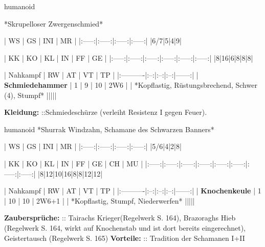 \label{duglim}
 {{humanoid
 		
 *Skrupelloser Zwergenschmied*


 |  WS  |  GS  |  INI  |  MR | 
 |:-----:|:-----:|:-----:|:-----:|
 |6/7|5|4|9|


 |  KK  |  KO  |  KL  |  IN  |  FF  |  GE  |
 |:-----:|:-----:|:-----:|:-----:|:-----:|:-----:|
 |8|16|6|8|8|8|


 | Nahkampf  | RW | AT | VT | TP    |
 |:----------|:--:|:--:|:--:|------:|
 | \textbf{Schmiedehammer} | 1  | 9 | 10 | 2W6 |
 | *Kopflastig, Rüstungsbrechend, Schwer (4), Stumpf* |||||


 \textbf{Kleidung:} ::Schmiedeschürze (verleiht Resistenz I gegen Feuer).


 }}


 {{humanoid
 *Shurrak Windzahn, Schamane des Schwarzen Banners*


 |  WS  |  GS  |  INI  |  MR | 
 |:-----:|:-----:|:-----:|:-----:|
 |5/6|4|2|8|


 |  KK  |  KO  |  KL  |  IN  |  FF  |  GE  |  CH  |  MU  |
 |:-----:|:-----:|:-----:|:-----:|:-----:|:-----:|:-----:|:-----:|
 |8|12|10|16|8|8|12|12|


 | Nahkampf  | RW | AT | VT | TP    |
 |:----------|:--:|:--:|:--:|------:|
 | \textbf{Knochenkeule} | 1  | 10 | 10 | 2W6+1 |
 | *Kopflastig, Stumpf, Niederwerfen* |||||


 \textbf{Zaubersprüche:} :: Tairachs Krieger(Regelwerk S. 164), Brazoraghs Hieb (Regelwerk S. 164, wirkt auf Knochenstab und ist dort bereits eingerechnet), Geistertausch (Regelwerk S. 165)
 \textbf{Vorteile:} :: Tradition der Schamanen I+II


 }}





\label{kuh_ho1}

\label{kuh_ho2}

\spaltenende